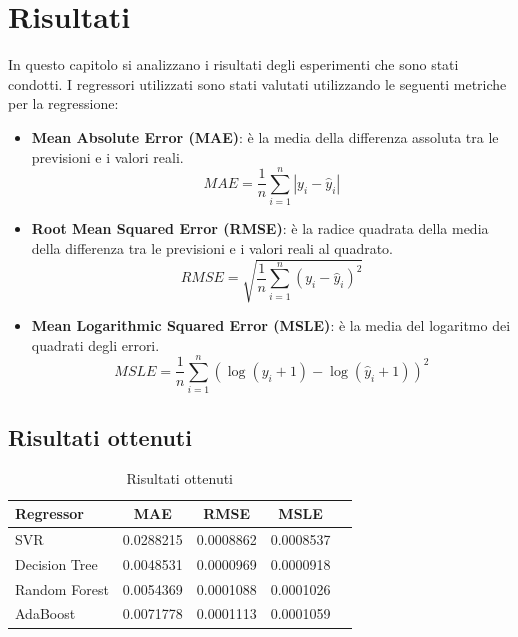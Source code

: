 \section{Risultati}

In questo capitolo si analizzano i risultati degli esperimenti che sono stati condotti. I regressori utilizzati sono stati valutati utilizzando le seguenti metriche per la regressione:
\begin{itemize}
    \item \textbf{Mean Absolute Error (MAE)}: è la media della differenza assoluta tra le previsioni e i valori reali.
    \begin{equation*}
        MAE = \frac{1}{n} \sum_{i=1}^{n} |y_i - \hat{y}_i|
    \end{equation*}
    \item \textbf{Root Mean Squared Error (RMSE)}: è la radice quadrata della media della differenza tra le previsioni e i valori reali al quadrato.
    \begin{equation*}
        RMSE = \sqrt{\frac{1}{n} \sum_{i=1}^{n} (y_i - \hat{y}_i)^2}
    \end{equation*}
    \item \textbf{Mean Logarithmic Squared Error (MSLE)}: è la media del logaritmo dei quadrati degli errori.
    \begin{equation*}
        MSLE = \frac{1}{n} \sum_{i=1}^{n} (\log(y_i + 1) - \log(\hat{y}_i + 1))^2
    \end{equation*}
\end{itemize}

\subsection{Risultati ottenuti}

\begin{table}[H]
    \centering
    \begin{tabular}{|>{\centering\arraybackslash}m{5cm}|c|c|c|c|}
        \hline
        \textbf{Regressor} & \textbf{MAE} & \textbf{RMSE} & \textbf{MSLE} \\ [10pt]
        \hline
        SVR & 0.0288215 & 0.0008862 & 0.0008537 \\ [10pt]
        \hline
        Decision Tree & 0.0048531 & 0.0000969 & 0.0000918 \\ [10pt]
        \hline
        Random Forest & 0.0054369 & 0.0001088 & 0.0001026 \\ [10pt]
        \hline
        AdaBoost & 0.0071778 & 0.0001113 & 0.0001059 \\ [10pt]
        \hline
    \end{tabular}
    \caption*{Risultati ottenuti}
    \label{tab:results}
\end{table}


